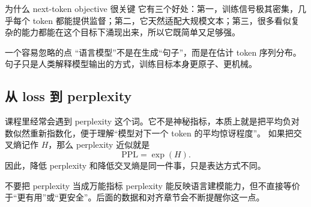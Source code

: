 \begin{knowledgebox}{为什么 next-token objective 很关键}
它有三个好处：第一，训练信号极其密集，几乎每个 token 都能提供监督；第二，它天然适配大规模文本；第三，很多看似复杂的能力都能在这个目标下涌现出来，所以它既简单又足够强。
\end{knowledgebox}

\begin{importantbox}{一个容易忽略的点}
“语言模型”不是在生成“句子”，而是在估计 token 序列分布。句子只是人类解释模型输出的方式，训练目标本身更原子、更机械。
\end{importantbox}

\subsection{从 loss 到 perplexity}

课程里经常会遇到 perplexity 这个词。它不是神秘指标，本质上就是把平均负对数似然重新指数化，便于理解“模型对下一个 token 的平均惊讶程度”。
如果把交叉熵记作 $H$，那么 perplexity 近似就是
\[
\mathrm{PPL} = \exp(H).
\]
因此，降低 perplexity 和降低交叉熵是同一件事，只是表达方式不同。

\begin{warningbox}{不要把 perplexity 当成万能指标}
perplexity 能反映语言建模能力，但不直接等价于“更有用”或“更安全”。后面的数据和对齐章节会不断提醒你这一点。
\end{warningbox}


